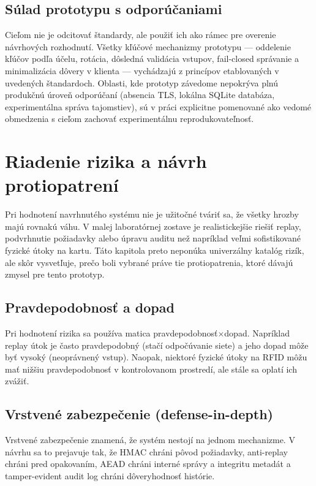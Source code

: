 \documentclass[journal,a4paper,onecolumn]{IEEEtran}
\begin{document}
\subsection{Súlad prototypu s odporúčaniami}

Cieľom nie je odcitovať štandardy, ale použiť ich ako rámec pre overenie návrhových rozhodnutí. Všetky kľúčové mechanizmy prototypu --- oddelenie kľúčov podľa účelu, rotácia, dôsledná validácia vstupov, fail-closed správanie a minimalizácia dôvery v klienta --- vychádzajú z princípov etablovaných v uvedených štandardoch. Oblasti, kde prototyp závedome nepokrýva plnú produkčnú úroveň odporúčaní (absencia TLS, lokálna SQLite databáza, experimentálna správa tajomstiev), sú v práci explicitne pomenované ako vedomé obmedzenia s cieľom zachovať experimentálnu reprodukovateľnosť.

\section{Riadenie rizika a návrh protiopatrení}

Pri hodnotení navrhnutého systému nie je užitočné tváriť sa, že všetky hrozby majú rovnakú váhu. V malej laboratórnej zostave je realistickejšie riešiť replay, podvrhnutie požiadavky alebo úpravu auditu než napríklad veľmi sofistikované fyzické útoky na kartu. Táto kapitola preto neponúka univerzálny katalóg rizík, ale skôr vysvetľuje, prečo boli vybrané práve tie protiopatrenia, ktoré dávajú zmysel pre tento prototyp.

\subsection{Pravdepodobnosť a dopad}

Pri hodnotení rizika sa používa matica pravdepodobnosť$\times$dopad. Napríklad replay útok je často pravdepodobný (stačí odpočúvanie siete) a jeho dopad môže byť vysoký (neoprávnený vstup). Naopak, niektoré fyzické útoky na RFID môžu mať nižšiu pravdepodobnosť v kontrolovanom prostredí, ale stále sa oplatí ich zvážiť.

\subsection{Vrstvené zabezpečenie (defense-in-depth)}

Vrstvené zabezpečenie znamená, že systém nestojí na jednom mechanizme. V návrhu sa to prejavuje tak, že HMAC chráni pôvod požiadavky,\cite{FIPS1981} anti-replay chráni pred opakovaním, AEAD chráni interné správy a integritu metadát\cite{RFC8439,LibsodiumXChaChaDoc} a tamper-evident audit log chráni dôveryhodnosť histórie.\cite{SchneierKelsey1999}
\end{document}
